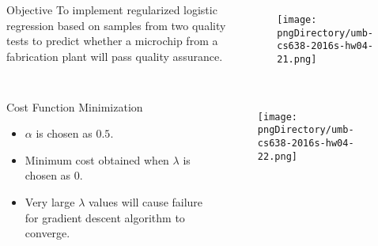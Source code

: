 \documentclass[aspectratio=169]{beamer}
\begin{document}
\begin{slide}

	\begin{columns}

	\begin{block}{Objective}
	To implement regularized logistic regression based on samples from two quality tests to predict whether a microchip from a fabrication plant will pass quality assurance.
	\end{block}

	\begin{figure}
	\texttt{[image: \\pngDirectory/umb-cs638-2016s-hw04-21.png]}
	\end{figure}

	\end{columns}

\end{slide}

\begin{slide}

	\begin{columns}

	\column{0.4\textwidth}
	\begin{block}{Cost Function Minimization}
	\begin{itemize}
	\item $\alpha$ is chosen as $0.5$.
	\item Minimum cost obtained when $\lambda$ is chosen as $0$.
	\item Very large $\lambda$ values will cause failure for gradient descent algorithm to converge.
	\end{itemize}
	\end{block}

	\column{0.6\textwidth}
	\begin{figure}
	\texttt{[image: \\pngDirectory/umb-cs638-2016s-hw04-22.png]}
	\end{figure}

	\end{columns}

\end{slide}
\end{document}
